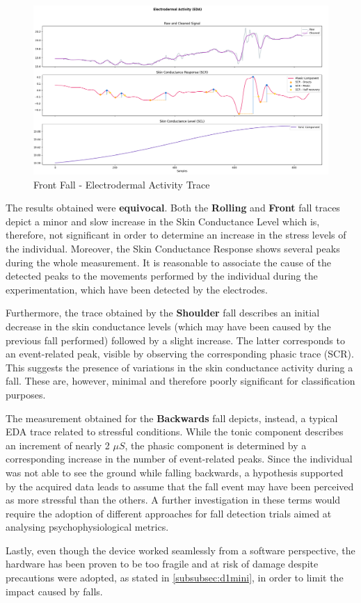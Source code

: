 \begin{figure}[H]
    \centering
    \includegraphics[width=\textwidth]{./images/bitalino/Front.png}
    \caption{Front Fall - Electrodermal Activity Trace}
    \label{fig:bitalino-front}
\end{figure}

\pagebreak

The results obtained were \textbf{equivocal}. Both the \textbf{Rolling} and \textbf{Front} fall traces depict a minor and slow increase in the Skin Conductance Level which is, therefore, not significant in order to determine an increase in the stress levels of the individual. Moreover, the Skin Conductance Response shows several peaks during the whole measurement. It is reasonable to associate the cause of the detected peaks to the movements performed by the individual during the experimentation, which have been detected by the electrodes.

Furthermore, the trace obtained by the \textbf{Shoulder} fall describes an initial decrease in the skin conductance levels (which may have been caused by the previous fall performed) followed by a slight increase. The latter corresponds to an event-related peak, visible by observing the corresponding phasic trace (SCR). This suggests the presence of variations in the skin conductance activity during a fall. These are, however, minimal and therefore poorly significant for classification purposes.

The measurement obtained for the \textbf{Backwards} fall depicts, instead, a typical EDA trace related to stressful conditions. While the tonic component describes an increment of nearly 2 $\mu S$, the phasic component is determined by a corresponding increase in the number of event-related peaks. Since the individual was not able to see the ground while falling backwards, a hypothesis supported by the acquired data leads to assume that the fall event may have been perceived as more stressful than the others. A further investigation in these terms would require the adoption of different approaches for fall detection trials aimed at analysing psychophysiological metrics.

Lastly, even though the device worked seamlessly from a software perspective, the hardware has been proven to be too fragile and at risk of damage despite precautions were adopted, as stated in \ref{subsubsec:d1mini}, in order to limit the impact caused by falls.



